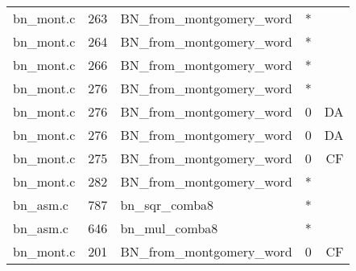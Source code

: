\begin{table}
\begin{tabular}{lrlrr}
bn\_mont.c& 263&BN\_from\_montgomery\_word&*&\\
bn\_mont.c& 264&BN\_from\_montgomery\_word&*&\\
bn\_mont.c& 266&BN\_from\_montgomery\_word&*&\\
bn\_mont.c& 276&BN\_from\_montgomery\_word&*&\\
bn\_mont.c& 276&BN\_from\_montgomery\_word&0 &DA\\
bn\_mont.c& 276&BN\_from\_montgomery\_word&0 &DA\\
bn\_mont.c& 275&BN\_from\_montgomery\_word&0 &CF\\
bn\_mont.c& 282&BN\_from\_montgomery\_word&*&\\
bn\_asm.c& 787&bn\_sqr\_comba8&*&\\
bn\_asm.c& 646&bn\_mul\_comba8&*&\\
bn\_mont.c& 201&BN\_from\_montgomery\_word&0 &CF\\
\hline
\end{tabular}
\end{table}
